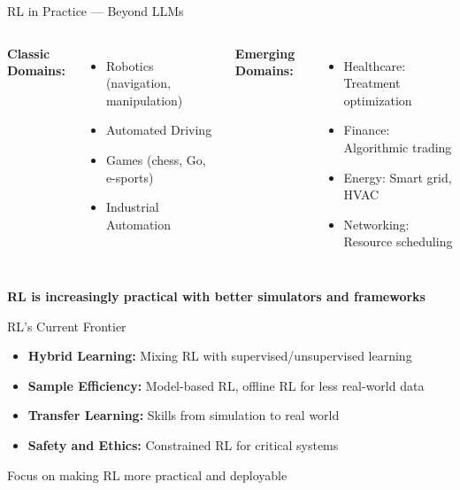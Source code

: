 \documentclass[aspectratio=169]{beamer}
\begin{document}
\begin{frame}{RL in Practice — Beyond LLMs}
  \begin{columns}
    \textbf{Classic Domains:}
    \begin{itemize}
      \item Robotics (navigation, manipulation)
      \item Automated Driving
      \item Games (chess, Go, e-sports)
      \item Industrial Automation
    \end{itemize}

    \textbf{Emerging Domains:}
    \begin{itemize}
      \item Healthcare: Treatment optimization
      \item Finance: Algorithmic trading
      \item Energy: Smart grid, HVAC
      \item Networking: Resource scheduling
    \end{itemize}
  \end{columns}

  \vspace{0.5cm}
  \centering
  \textbf{RL is increasingly practical with better simulators and frameworks}
\end{frame}

\begin{frame}{RL's Current Frontier}
  \begin{itemize}
    \item \textbf{Hybrid Learning:} Mixing RL with
      supervised/unsupervised learning
    \item \textbf{Sample Efficiency:} Model-based RL, offline RL for
      less real-world data
    \item \textbf{Transfer Learning:} Skills from simulation to real world
    \item \textbf{Safety and Ethics:} Constrained RL for critical systems
  \end{itemize}

  \vspace{0.5cm}
  \centering
  Focus on making RL more practical and deployable
\end{frame}
\end{document}
